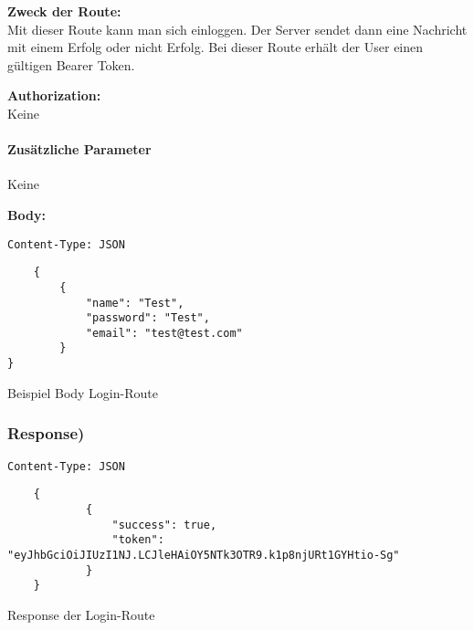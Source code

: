 \textbf{Zweck der Route:} \\
Mit dieser Route kann man sich einloggen. Der Server
sendet dann eine Nachricht mit einem Erfolg oder nicht Erfolg.
Bei dieser Route erhält der User einen gültigen Bearer Token.

\textbf{Authorization:} \\
Keine

\paragraph{Zusätzliche Parameter}
Keine

\textbf{Body:}
\begin{code}
    \lstinline{Content-Type: JSON}
    \begin{lstlisting}
    {
        {
            "name": "Test",
            "password": "Test",
            "email": "test@test.com"
        }  
}
\end{lstlisting}
    \caption{Beispiel Body Login-Route}
\end{code}


\subsubsection{Response)}
\begin{code}
    \lstinline{Content-Type: JSON}
    \begin{lstlisting}
    {
            {
                "success": true,
                "token": "eyJhbGciOiJIUzI1NJ.LCJleHAiOY5NTk3OTR9.k1p8njURt1GYHtio-Sg"
            }
    }
    \end{lstlisting}
    \caption{Response der Login-Route}
\end{code}

\pagebreak